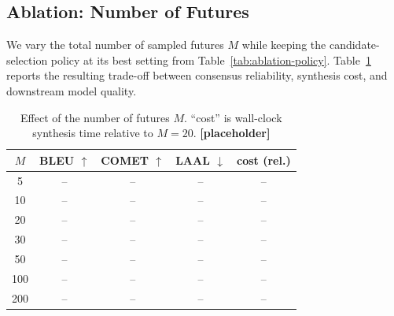 \subsection{Ablation: Number of Futures}

We vary the total number of sampled futures $M$ while keeping the
candidate-selection policy at its best setting from
Table~\ref{tab:ablation-policy}. Table~\ref{tab:ablation-futures} reports
the resulting trade-off between consensus reliability, synthesis cost,
and downstream model quality.

\begin{table}[t]
\centering
\small
\begin{tabular}{ccccc}
\hline
$M$ & \textbf{BLEU} $\uparrow$ & \textbf{COMET} $\uparrow$ & \textbf{LAAL} $\downarrow$ & \textbf{cost} (rel.) \\
\hline
5    & -- & -- & -- & -- \\
10   & -- & -- & -- & -- \\
20   & -- & -- & -- & -- \\
30   & -- & -- & -- & -- \\
50   & -- & -- & -- & -- \\
100  & -- & -- & -- & -- \\
200  & -- & -- & -- & -- \\
\hline
\end{tabular}
\caption{Effect of the number of futures $M$. ``cost'' is wall-clock
synthesis time relative to $M{=}20$. \textbf{[placeholder]}}
\label{tab:ablation-futures}
\end{table}

